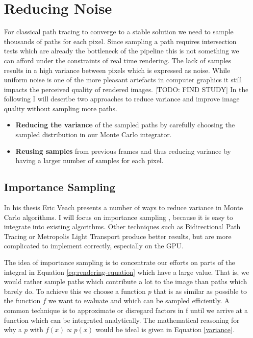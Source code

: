 \documentclass{ACGSeminar}
\begin{document}
\section{Reducing Noise} \label{noise}
For classical path tracing to converge to a stable solution we need to sample thousands of paths for each pixel. Since sampling a path requires intersection tests which are already the bottleneck of the pipeline this is not something we can afford under the constraints of real time rendering. The lack of samples results in a high variance between pixels which is expressed as noise. While uniform noise is one of the more pleasant artefacts in computer graphics it still impacts the perceived quality of rendered images. [TODO: FIND STUDY]
In the following I will describe two approaches to reduce variance and improve image quality without sampling more paths.
\begin{itemize}
\item \textbf{Reducing the variance} of the sampled paths by carefully choosing the sampled distribution in our Monte Carlo integrator.
\item \textbf{Reusing samples} from previous frames and thus reducing variance by having a larger number of samples for each pixel.
\end{itemize}

\subsection{Importance Sampling}
In his thesis Eric Veach presents a number of ways to reduce variance in Monte Carlo algorithms. \cite[45--70]{veach1997robust} I will focus on importance sampling \cite[47--48]{veach1997robust}, because it is easy to integrate into existing algorithms. Other techniques such as Bidirectional Path Tracing or Metropolis Light Transport produce better results, but are more complicated to implement correctly, especially on the GPU.

The idea of importance sampling is to concentrate our efforts on parts of the integral in Equation \eqref{eq:rendering-equation} which have a large value. That is, we would rather sample paths which contribute a lot to the image than paths which barely do. To achieve this we choose a function $p$ that is as similar as possible to the function $f$ we want to evaluate and which can be sampled efficiently. A common technique is to approximate or disregard factors in f until we arrive at a function which can be integrated analytically. The mathematical reasoning for why a $p$ with $f(x) \propto p(x)$ would be ideal is given in Equation \eqref{variance}.
\end{document}
